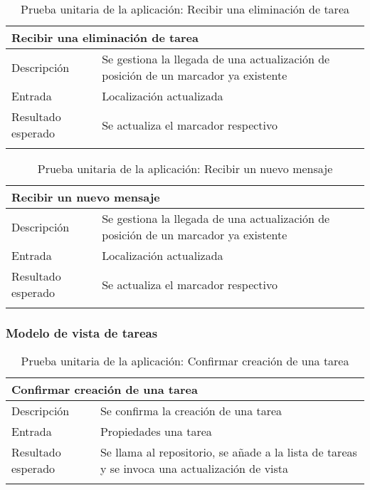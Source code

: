 \vspace{-20pt}
\begin{longtable}{|p{} p{}|}
    \hline
    \multicolumn{2}{|l|}{\textbf{Recibir una eliminación de tarea}} \\ \hline 
    Descripción                 & Se gestiona la llegada de una actualización de posición de un marcador ya existente \\ \hline
    Entrada                     & Localización actualizada \\ \hline
    Resultado esperado          & Se actualiza el marcador respectivo \\ \hline
    \caption{Prueba unitaria de la aplicación: Recibir una eliminación de tarea}
    \label{cp:u:app:recibir_eliminacion_tarea}
\end{longtable}

\vspace{-20pt}
\begin{longtable}{|p{} p{}|}
    \hline
    \multicolumn{2}{|l|}{\textbf{Recibir un nuevo mensaje}} \\ \hline 
    Descripción                 & Se gestiona la llegada de una actualización de posición de un marcador ya existente \\ \hline
    Entrada                     & Localización actualizada \\ \hline
    Resultado esperado          & Se actualiza el marcador respectivo \\ \hline
    \caption{Prueba unitaria de la aplicación: Recibir un nuevo mensaje}
    \label{cp:u:app:recibir_nuevo_mensaje}
\end{longtable}
    
\vspace{-20pt}
\subsubsection{Modelo de vista de tareas}

\vspace{-5pt}
\begin{longtable}{|p{} p{}|}
    \hline
    \multicolumn{2}{|l|}{\textbf{Confirmar creación de una tarea}} \\ \hline 
    Descripción                 & Se confirma la creación de una tarea \\ \hline
    Entrada                     & Propiedades una tarea \\ \hline
    Resultado esperado          & Se llama al repositorio, se añade a la lista de tareas y se invoca una actualización de vista \\ \hline
    \caption{Prueba unitaria de la aplicación: Confirmar creación de una tarea}
    \label{cp:u:app:confirmar_creacion_tarea}
\end{longtable}

